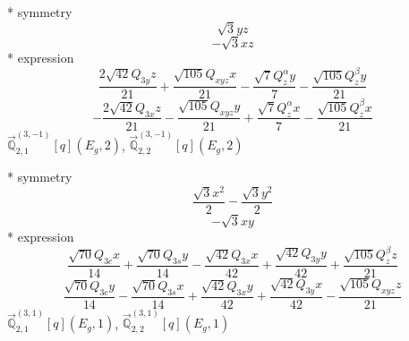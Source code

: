 \documentclass[fleqn,8pt]{jsarticle}
\begin{document}
\noindent\quad ** symmetry
\begin{dmath*}
\sqrt{3} y z
\end{dmath*}
\begin{dmath*}
- \sqrt{3} x z
\end{dmath*}
\noindent\quad ** expression
\begin{dmath*}
\frac{2 \sqrt{42} Q_{3y} z}{21} + \frac{\sqrt{105} Q_{xyz} x}{21} - \frac{\sqrt{7} Q_{z}^{\alpha} y}{7} - \frac{\sqrt{105} Q_{z}^{\beta} y}{21}
\end{dmath*}
\begin{dmath*}
- \frac{2 \sqrt{42} Q_{3x} z}{21} - \frac{\sqrt{105} Q_{xyz} y}{21} + \frac{\sqrt{7} Q_{z}^{\alpha} x}{7} - \frac{\sqrt{105} Q_{z}^{\beta} x}{21}
\end{dmath*}
\noindent\quad $\vec{\mathbb{Q}}_{2,1}^{(3,-1)}[q](E_{g},2)$, $\vec{\mathbb{Q}}_{2,2}^{(3,-1)}[q](E_{g},2)$

\noindent\quad ** symmetry
\begin{dmath*}
\frac{\sqrt{3} x^{2}}{2} - \frac{\sqrt{3} y^{2}}{2}
\end{dmath*}
\begin{dmath*}
- \sqrt{3} x y
\end{dmath*}
\noindent\quad ** expression
\begin{dmath*}
\frac{\sqrt{70} Q_{3c} x}{14} + \frac{\sqrt{70} Q_{3s} y}{14} - \frac{\sqrt{42} Q_{3x} x}{42} + \frac{\sqrt{42} Q_{3y} y}{42} + \frac{\sqrt{105} Q_{z}^{\beta} z}{21}
\end{dmath*}
\begin{dmath*}
\frac{\sqrt{70} Q_{3c} y}{14} - \frac{\sqrt{70} Q_{3s} x}{14} + \frac{\sqrt{42} Q_{3x} y}{42} + \frac{\sqrt{42} Q_{3y} x}{42} - \frac{\sqrt{105} Q_{xyz} z}{21}
\end{dmath*}
\noindent\quad $\vec{\mathbb{Q}}_{2,1}^{(3,1)}[q](E_{g},1)$, $\vec{\mathbb{Q}}_{2,2}^{(3,1)}[q](E_{g},1)$
\end{document}
